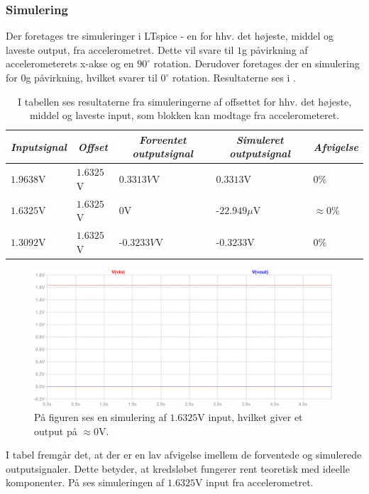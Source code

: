 \subsubsection{Simulering}
Der foretages tre simuleringer i LTspice - en for hhv. det højeste, middel og laveste output, fra accelerometret. Dette vil svare til $1$g påvirkning af accelerometerets x-akse og en $90^{\circ}$ rotation. Derudover foretages der en simulering for $0$g påvirkning, hvilket svarer til $0^{\circ}$ rotation. Resultaterne ses i .
\begin{table}[H]
	\centering
	\begin{tabular}{|l|l|l|l|l|}
		\hline
		\multicolumn{1}{|c|}{\textit{Inputsignal}} & \multicolumn{1}{c|}{\textit{Offset}} & \multicolumn{1}{c|}{\textit{Forventet outputsignal}} & \multicolumn{1}{c|}{\textit{Simuleret outputsignal}} & \multicolumn{1}{c|}{\textit{Afvigelse}} \\ \hline
		$1.9638$V     & $1.6325$V    & $0.3313V$V    & $0.3313$V       & $0$\%              \\ \hline
		$1.6325$V     & $1.6325$V    & $0$V          & -$22.949\mu$V   & $\approx 0$\%      \\ \hline
		$1.3092$V     & $1.6325$V    & -$0.3233V$V   & -$0.3233$V      & $0$\%                \\ \hline
	\end{tabular}
	\caption{I tabellen ses resultaterne fra simuleringerne af offsettet for hhv. det højeste, middel og laveste input, som blokken kan modtage fra accelerometeret.}
	\label{Tab:offset_sim}
\end{table} 
\begin{figure}[H]
\centering
\includegraphics[scale=0.38]{figures/cProblemloesning/Offset_simulering.png}
\caption{På figuren ses en simulering af $1.6325$V input, hvilket giver et output på $\approx 0$V.}
\label{fig:Offset_simulering}
\end{figure}
\noindent I tabel  fremgår det, at der er en lav afvigelse imellem de forventede og simulerede outputsignaler. Dette betyder, at kredsløbet fungerer rent teoretisk med ideelle komponenter. På  ses simuleringen af $1.6325$V input fra accelerometret.
